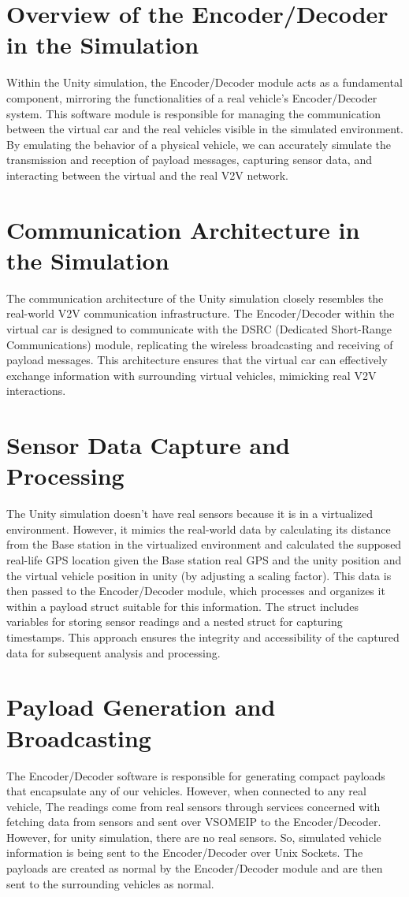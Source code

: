 \documentclass[
12pt,
oneside, 
onehalfspacing, 
nolistspacing, 
parskip, 
chapterinoneline, 
]{AASTCOMPUTER}
\begin{document}
\section{Overview of the Encoder/Decoder in the Simulation}
Within the Unity simulation, the Encoder/Decoder module acts as a fundamental component, mirroring the functionalities of a real vehicle's Encoder/Decoder system. This software module is responsible for managing the communication between the virtual car and the real vehicles visible in the simulated environment. By emulating the behavior of a physical vehicle, we can accurately simulate the transmission and reception of payload messages, capturing sensor data, and interacting between the virtual and the real V2V network.

\section{Communication Architecture in the Simulation}
The communication architecture of the Unity simulation closely resembles the real-world V2V communication infrastructure. The Encoder/Decoder within the virtual car is designed to communicate with the DSRC (Dedicated Short-Range Communications) module, replicating the wireless broadcasting and receiving of payload messages. This architecture ensures that the virtual car can effectively exchange information with surrounding virtual vehicles, mimicking real V2V interactions.

\section{Sensor Data Capture and Processing}
The Unity simulation doesn't have real sensors because it is in a virtualized environment. However, it mimics the real-world data by calculating its distance from the Base station in the virtualized environment and calculated the supposed real-life GPS location given the Base station real GPS and the unity position and the virtual vehicle position in unity (by adjusting a scaling factor). This data is then passed to the Encoder/Decoder module, which processes and organizes it within a payload struct suitable for this information. The struct includes variables for storing sensor readings and a nested struct for capturing timestamps. This approach ensures the integrity and accessibility of the captured data for subsequent analysis and processing.

\section{Payload Generation and Broadcasting}
The Encoder/Decoder software is responsible for generating compact payloads that encapsulate any of our vehicles. However, when connected to any real vehicle, The readings come from real sensors through services concerned with fetching data from sensors and sent over VSOMEIP to the Encoder/Decoder. However, for unity simulation, there are no real sensors. So, simulated vehicle information is being sent to the Encoder/Decoder over Unix Sockets. The payloads are created as normal by the Encoder/Decoder module and are then sent to the surrounding vehicles as normal.
\end{document}
